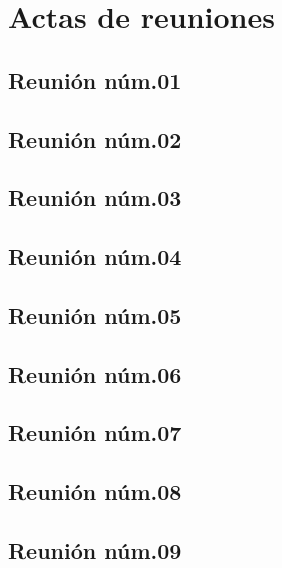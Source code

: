 \documentclass[10pt,spanish]{article}
\begin{document}
\section{Actas de reuniones}


\subsection{Reunión núm.01}


\subsection{Reunión núm.02}


\subsection{Reunión núm.03}


\subsection{Reunión núm.04}


\subsection{Reunión núm.05}


\subsection{Reunión núm.06}
%

\subsection{Reunión núm.07}


\subsection{Reunión núm.08}


\subsection{Reunión núm.09}

\end{document}
